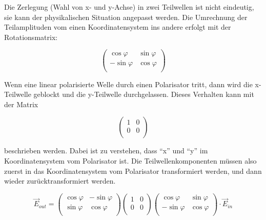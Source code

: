 Die Zerlegung (Wahl von x- und y-Achse) in  zwei Teilwellen ist nicht eindeutig,
sie  kann  der  physikalischen  Situation angepasst werden. Die  Umrechnung  der
Teilamplituden  vom  einen  Koordinatensystem   ins   andere   erfolgt  mit  der
Rotationsmatrix:

\begin{equation}
    \begin{pmatrix}
        \cos\varphi  & \sin\varphi \\
        -\sin\varphi & \cos\varphi \\
    \end{pmatrix}
\end{equation}

Wenn eine linear polarisierte Welle durch einen Polarisator tritt, dann wird die
x-Teilwelle geblockt und die  y-Teilwelle  durchgelassen.  Dieses Verhalten kann
mit der Matrix

\begin{equation}
    \begin{pmatrix}
        1 & 0 \\ 0 & 0 \\
    \end{pmatrix}
\end{equation}

beschrieben   werden.   Dabei   ist  zu  verstehen,  dass  ``x''  und  ``y''  im
Koordinatensystem vom Polarisator ist.  Die  Teilwellenkomponenten m\"ussen also
zuerst in das Koordinatensystem vom Polarisator transformiert werden,  und  dann
wieder zur\"ucktransformiert werden.

\begin{equation}
    \vec{E}_{out} = \begin{pmatrix}
        \cos\varphi & -\sin\varphi \\
        \sin\varphi &  \cos\varphi \\
    \end{pmatrix}\begin{pmatrix}
        1 & 0 \\ 0 & 0 \\
    \end{pmatrix}\begin{pmatrix}
        \cos\varphi  & \sin\varphi \\
        -\sin\varphi & \cos\varphi \\
    \end{pmatrix} \cdot\vec{E}_{in}
    \label{eq:polarisator}
\end{equation}

